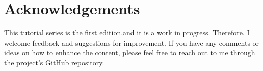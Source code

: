 \section*{Acknowledgements}

This tutorial series is the first edition,and it is a work in progress. Therefore, I welcome feedback and suggestions for improvement. If you have any comments or ideas on how to enhance the content, please feel free to reach out to me through the project's GitHub repository.



